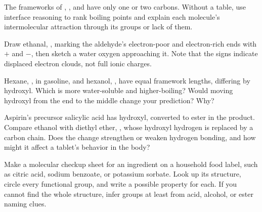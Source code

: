 \begin{sikaoti}
\item The frameworks of , , and  have only one or two carbons. Without a table, use interface reasoning to rank boiling points and explain each molecule's intermolecular attraction through its groups or lack of them.
\item Draw ethanal, , marking the aldehyde's electron-poor and electron-rich ends with $+$ and $-$, then sketch a water oxygen approaching it. Note that the signs indicate displaced electron clouds, not full ionic charges.
\item Hexane, , in gasoline, and hexanol, , have equal framework lengths, differing by hydroxyl. Which is more water-soluble and higher-boiling? Would moving hydroxyl from the end to the middle change your prediction? Why?
\item Aspirin's precursor salicylic acid has hydroxyl, converted to ester in the product. Compare ethanol with diethyl ether, , whose hydroxyl hydrogen is replaced by a carbon chain. Does the change strengthen or weaken hydrogen bonding, and how might it affect a tablet's behavior in the body?
\item Make a molecular checkup sheet for an ingredient on a household food label, such as citric acid, sodium benzoate, or potassium sorbate. Look up its structure, circle every functional group, and write a possible property for each. If you cannot find the whole structure, infer groups at least from acid, alcohol, or ester naming clues.
\end{sikaoti}

